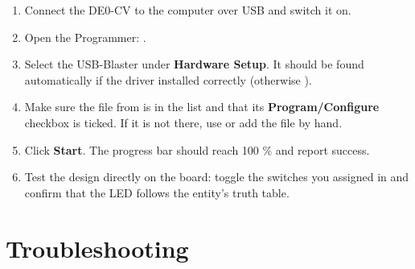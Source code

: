 \begin{enumerate}
  \item Connect the DE0-CV to the computer over USB and switch it on.
  \item Open the Programmer: .
  \item Select the USB-Blaster under \textbf{Hardware Setup}. It should be found automatically if the
    driver installed correctly (otherwise ).
  \item Make sure the  file from  is in the list and that its
    \textbf{Program/Configure} checkbox is ticked. If it is not there, use  or add
    the file by hand.
  \item Click \textbf{Start}. The progress bar should reach 100 \% and report success.
  \item Test the design directly on the board: toggle the switches you assigned in
     and confirm that the LED follows the entity's truth table.
\end{enumerate}

\section{Troubleshooting}
\label{app:quartus:trouble}

